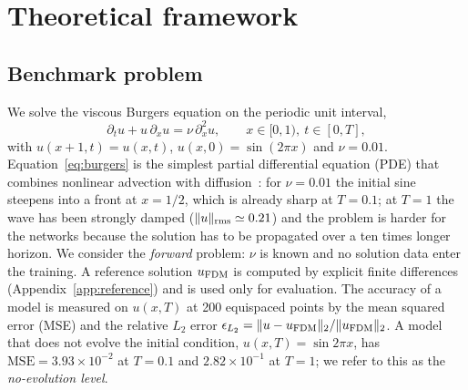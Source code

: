 \documentclass[floatfix,aps,pra,twocolumn,superscriptaddress,10pt,nofootinbib]{revtex4-2}
\begin{document}
\newpage
\section{Theoretical framework}\label{sec:theory}

\subsection{Benchmark problem}\label{sec:problem}
We solve the viscous Burgers equation on the periodic unit interval,
\begin{equation}
  \partial_t u + u\,\partial_x u = \nu\,\partial_x^2 u,\qquad x\in[0,1),\ t\in[0,T],
  \label{eq:burgers}
\end{equation}
with $u(x+1,t)=u(x,t)$, $u(x,0)=\sin(2\pi x)$ and $\nu=0.01$. Equation~\eqref{eq:burgers} is the simplest partial differential equation (PDE) that combines nonlinear advection with diffusion~\cite{basdevant1986spectral}: for $\nu=0.01$ the initial sine steepens into a front at $x=1/2$, which is already sharp at $T=0.1$; at $T=1$ the wave has been strongly damped ($\|u\|_{\rm rms}\simeq0.21$) and the problem is harder for the networks because the solution has to be propagated over a ten times longer horizon. We consider the \emph{forward} problem: $\nu$ is known and no solution data enter the training. A reference solution $u_{\rm FDM}$ is computed by explicit finite differences (Appendix~\ref{app:reference}) and is used only for evaluation. The accuracy of a model is measured on $u(x,T)$ at 200 equispaced points by the mean squared error (MSE) and the relative $L_2$ error $\epsilon_{L_2}=\|u-u_{\rm FDM}\|_2/\|u_{\rm FDM}\|_2$. A model that does not evolve the initial condition, $u(x,T)=\sin2\pi x$, has $\mathrm{MSE}=3.93\times10^{-2}$ at $T=0.1$ and $2.82\times10^{-1}$ at $T=1$; we refer to this as the \emph{no-evolution level}.
\end{document}
